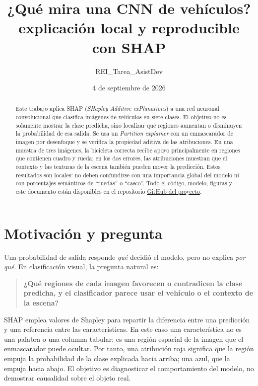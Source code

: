 \documentclass[11pt,a4paper]{article}
\title{\textbf{¿Qué mira una CNN de vehículos?\\ explicación local y reproducible con SHAP}}
\author{REI\_Tarea\_AsistDev}
\date{4 de septiembre de 2026}
\begin{document}
\maketitle

\begin{abstract}
Este trabajo aplica SHAP (\emph{SHapley Additive exPlanations}) a una red
neuronal convolucional que clasifica imágenes de vehículos en siete clases.
El objetivo no es solamente mostrar la clase predicha, sino localizar qué
regiones aumentan o disminuyen la probabilidad de esa salida. Se usa un
\emph{Partition explainer} con un enmascarador de imagen por desenfoque y se
verifica la propiedad aditiva de las atribuciones. En una muestra de tres
imágenes, la bicicleta correcta recibe apoyo principalmente en regiones que
contienen cuadro y rueda; en los dos errores, las atribuciones muestran que el
contexto y las texturas de la escena también pueden mover la predicción. Estos
resultados son locales: no deben confundirse con una importancia global del
modelo ni con porcentajes semánticos de “ruedas” o “casco”. Todo el código,
modelo, figuras y este documento están disponibles en el repositorio
\href{https://github.com/nel-eleven11/REI_Tarea_AsistDev}{GitHub del proyecto}.
\end{abstract}

\section{Motivación y pregunta}

Una probabilidad de salida responde \emph{qué} decidió el modelo, pero no
explica \emph{por qué}. En clasificación visual, la pregunta natural es:

\begin{quote}
\textbf{¿Qué regiones de cada imagen favorecen o contradicen la clase
predicha, y el clasificador parece usar el vehículo o el contexto de la
escena?}
\end{quote}

SHAP emplea valores de Shapley para repartir la diferencia entre una predicción
y una referencia entre las características. En este caso una característica
no es una palabra o una columna tabular: es una región espacial de la imagen
que el enmascarador puede ocultar. Por tanto, una atribución roja significa que
la región empuja la probabilidad de la clase explicada hacia arriba; una azul,
que la empuja hacia abajo. El objetivo es diagnosticar el comportamiento del
modelo, no demostrar causalidad sobre el objeto real.
\end{document}
